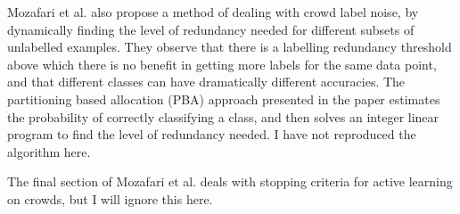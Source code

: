 \documentclass[a4paper]{article}
\begin{document}
    Mozafari et al. also propose a method of dealing with crowd label noise, by dynamically finding the level of redundancy needed for different subsets of unlabelled examples. They observe that there is a labelling redundancy threshold above which there is no benefit in getting more labels for the same data point, and that different classes can have dramatically different accuracies. The partitioning based allocation (PBA) approach presented in the paper estimates the probability of correctly classifying a class, and then solves an integer linear program to find the level of redundancy needed. I have not reproduced the algorithm here.

    The final section of Mozafari et al. deals with stopping criteria for active learning on crowds, but I will ignore this here.

    
    
\end{document}
